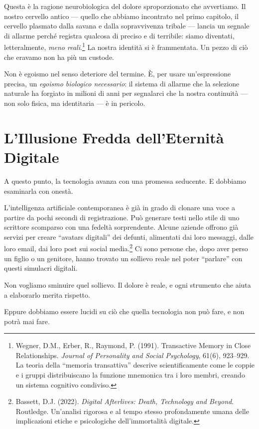 Questa è la ragione neurobiologica del dolore sproporzionato che avvertiamo. Il nostro cervello antico --- quello che abbiamo incontrato nel primo capitolo, il cervello plasmato dalla savana e dalla sopravvivenza tribale --- lancia un segnale di allarme perché registra qualcosa di preciso e di terribile: siamo diventati, letteralmente, \emph{meno reali}.\footnote{Wegner, D.M., Erber, R., Raymond, P. (1991). Transactive Memory in Close Relationships. \textit{Journal of Personality and Social Psychology}, 61(6), 923--929. La teoria della ``memoria transattiva'' descrive scientificamente come le coppie e i gruppi distribuiscano la funzione mnemonica tra i loro membri, creando un sistema cognitivo condiviso.} La nostra identità si è frammentata. Un pezzo di ciò che eravamo non ha più un custode.

Non è egoismo nel senso deteriore del termine. È, per usare un'espressione precisa, un \emph{egoismo biologico necessario}: il sistema di allarme che la selezione naturale ha forgiato in milioni di anni per segnalarci che la nostra continuità --- non solo fisica, ma identitaria --- è in pericolo.

\section{L'Illusione Fredda dell'Eternità Digitale}

A questo punto, la tecnologia avanza con una promessa seducente. E dobbiamo esaminarla con onestà.

L'intelligenza artificiale contemporanea è già in grado di clonare una voce a partire da pochi secondi di registrazione. Può generare testi nello stile di uno scrittore scomparso con una fedeltà sorprendente. Alcune aziende offrono già servizi per creare ``avatars digitali'' dei defunti, alimentati dai loro messaggi, dalle loro email, dai loro post sui social media.\footnote{Bassett, D.J. (2022). \textit{Digital Afterlives: Death, Technology and Beyond}. Routledge. Un'analisi rigorosa e al tempo stesso profondamente umana delle implicazioni etiche e psicologiche dell'immortalità digitale.} Ci sono persone che, dopo aver perso un figlio o un genitore, hanno trovato un sollievo reale nel poter ``parlare'' con questi simulacri digitali.

Non vogliamo sminuire quel sollievo. Il dolore è reale, e ogni strumento che aiuta a elaborarlo merita rispetto.

Eppure dobbiamo essere lucidi su ciò che quella tecnologia non può fare, e non potrà mai fare.

